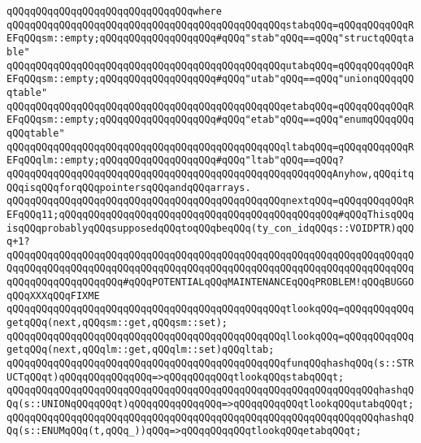 \verb|qQQqqQQqqQQqqQQqqQQqqQQqqQQqqQQqwhere|\newline
\newline
\verb|qQQqqQQqqQQqqQQqqQQqqQQqqQQqqQQqqQQqqQQqqQQqqQQqstabqQQq=qQQqqQQqqQQqREFqQQqsm::empty;qQQqqQQqqQQqqQQqqQQq#qQQq"stab"qQQq==qQQq"structqQQqtable"|\newline
\verb|qQQqqQQqqQQqqQQqqQQqqQQqqQQqqQQqqQQqqQQqqQQqqQQqutabqQQq=qQQqqQQqqQQqREFqQQqsm::empty;qQQqqQQqqQQqqQQqqQQq#qQQq"utab"qQQq==qQQq"unionqQQqqQQqtable"|\newline
\verb|qQQqqQQqqQQqqQQqqQQqqQQqqQQqqQQqqQQqqQQqqQQqqQQqetabqQQq=qQQqqQQqqQQqREFqQQqsm::empty;qQQqqQQqqQQqqQQqqQQq#qQQq"etab"qQQq==qQQq"enumqQQqqQQqqQQqtable"|\newline
\verb|qQQqqQQqqQQqqQQqqQQqqQQqqQQqqQQqqQQqqQQqqQQqqQQqltabqQQq=qQQqqQQqqQQqREFqQQqlm::empty;qQQqqQQqqQQqqQQqqQQq#qQQq"ltab"qQQq==qQQq?qQQqqQQqqQQqqQQqqQQqqQQqqQQqqQQqqQQqqQQqqQQqqQQqqQQqqQQqAnyhow,qQQqitqQQqisqQQqforqQQqpointersqQQqandqQQqarrays.|\newline
\newline
\verb|qQQqqQQqqQQqqQQqqQQqqQQqqQQqqQQqqQQqqQQqqQQqqQQqnextqQQq=qQQqqQQqqQQqREFqQQq11;qQQqqQQqqQQqqQQqqQQqqQQqqQQqqQQqqQQqqQQqqQQqqQQq#qQQqThisqQQqisqQQqprobablyqQQqsupposedqQQqtoqQQqbeqQQq(ty_con_idqQQqs::VOIDPTR)qQQq+1?|\newline
\verb|qQQqqQQqqQQqqQQqqQQqqQQqqQQqqQQqqQQqqQQqqQQqqQQqqQQqqQQqqQQqqQQqqQQqqQQqqQQqqQQqqQQqqQQqqQQqqQQqqQQqqQQqqQQqqQQqqQQqqQQqqQQqqQQqqQQqqQQqqQQqqQQqqQQqqQQqqQQqqQQq#qQQqPOTENTIALqQQqMAINTENANCEqQQqPROBLEM!qQQqBUGGOqQQqXXXqQQqFIXME|\newline
\newline
\verb|qQQqqQQqqQQqqQQqqQQqqQQqqQQqqQQqqQQqqQQqqQQqqQQqtlookqQQq=qQQqqQQqqQQqgetqQQq(next,qQQqsm::get,qQQqsm::set);|\newline
\verb|qQQqqQQqqQQqqQQqqQQqqQQqqQQqqQQqqQQqqQQqqQQqqQQqllookqQQq=qQQqqQQqqQQqgetqQQq(next,qQQqlm::get,qQQqlm::set)qQQqltab;|\newline
\newline
\verb|qQQqqQQqqQQqqQQqqQQqqQQqqQQqqQQqqQQqqQQqqQQqqQQqfunqQQqhashqQQq(s::STRUCTqQQqt)qQQqqQQqqQQqqQQq=>qQQqqQQqqQQqtlookqQQqstabqQQqt;|\newline
\verb|qQQqqQQqqQQqqQQqqQQqqQQqqQQqqQQqqQQqqQQqqQQqqQQqqQQqqQQqqQQqqQQqhashqQQq(s::UNIONqQQqqQQqt)qQQqqQQqqQQqqQQq=>qQQqqQQqqQQqtlookqQQqutabqQQqt;|\newline
\verb|qQQqqQQqqQQqqQQqqQQqqQQqqQQqqQQqqQQqqQQqqQQqqQQqqQQqqQQqqQQqqQQqhashqQQq(s::ENUMqQQq(t,qQQq_))qQQq=>qQQqqQQqqQQqtlookqQQqetabqQQqt;|\newline
